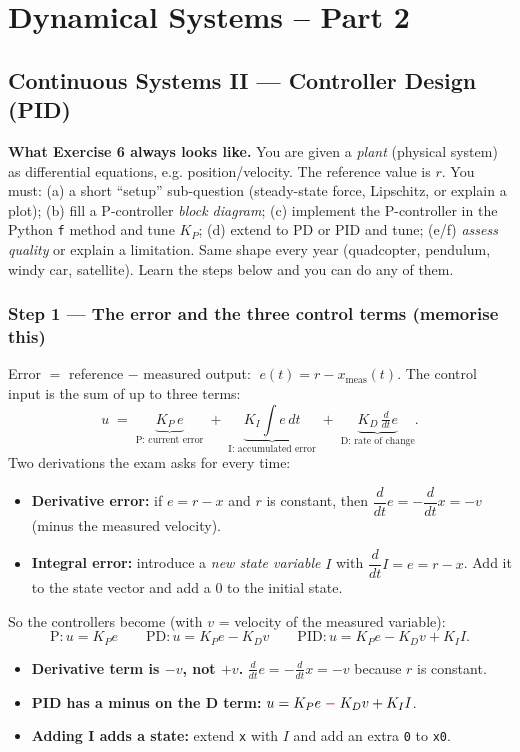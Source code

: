 \chapter{Dynamical Systems -- Part 2}

\section*{Continuous Systems II --- Controller Design (PID)}

\textbf{What Exercise 6 always looks like.} You are given a \emph{plant} (physical system) as
differential equations, e.g. position/velocity. The reference value is $r$. You must:
(a) a short ``setup'' sub-question (steady-state force, Lipschitz, or explain a plot);
(b) fill a P-controller \emph{block diagram};
(c) implement the P-controller in the Python \texttt{f} method and tune $K_P$;
(d) extend to PD or PID and tune;
(e/f) \emph{assess quality} or explain a limitation. Same shape every year (quadcopter, pendulum,
windy car, satellite). Learn the steps below and you can do any of them.

\subsection*{Step 1 --- The error and the three control terms (memorise this)}
Error $=$ reference $-$ measured output: $\; e(t) = r - x_{\text{meas}}(t)$.
The control input is the sum of up to three terms:
\[
u \;=\; \underbrace{K_P\,e}_{\text{P: current error}}
\;+\; \underbrace{K_I\!\int e\,dt}_{\text{I: accumulated error}}
\;+\; \underbrace{K_D\,\tfrac{d}{dt}e}_{\text{D: rate of change}} .
\]
Two derivations the exam asks for every time:
\begin{itemize}
  \item \textbf{Derivative error:} if $e = r - x$ and $r$ is constant, then
        $\dfrac{d}{dt}e = -\dfrac{d}{dt}x = -v$ (minus the measured velocity).
  \item \textbf{Integral error:} introduce a \emph{new state variable} $I$ with
        $\dfrac{d}{dt}I = e = r - x$. Add it to the state vector and add a $0$ to the initial state.
\end{itemize}
So the controllers become (with $v$ = velocity of the measured variable):
\[
\text{P}: u = K_P e \qquad
\text{PD}: u = K_P e - K_D v \qquad
\text{PID}: u = K_P e - K_D v + K_I I .
\]

\begin{warnbox}
\begin{itemize}[leftmargin=1.2em,itemsep=1pt,topsep=2pt]
  \item \textbf{Derivative term is $-v$, not $+v$.} \quad $\tfrac{d}{dt}e = -\tfrac{d}{dt}x = -v$ because $r$ is constant.
  \item \textbf{PID has a minus on the D term:} $u = K_P e \;{\color{red!70!black}-}\; K_D v + K_I I$.
  \item \textbf{Adding I adds a state:} extend \texttt{x} with $I$ and add an extra \texttt{0} to \texttt{x0}.
\end{itemize}
\end{warnbox}

